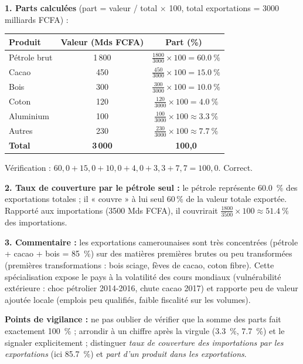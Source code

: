\documentclass[11pt]{article}
\newcommand{\cle}[1]{{\popxbold\color{popdark}#1}}
\begin{document}
\begin{corrige}
\textbf{1. Parts calculées} (part = valeur / total $\times$ 100, total exportations = \num{3000} milliards FCFA) :
\begin{center}
\begin{tabular}{|l|c|c|}\hline
\textbf{Produit} & \textbf{Valeur (Mds FCFA)} & \textbf{Part (\%)\ } \\ \hline
Pétrole brut & 1\,800 & $\frac{1800}{3000}\times100 = \SI{60,0}{\%}$ \\ \hline
Cacao & 450 & $\frac{450}{3000}\times100 = \SI{15,0}{\%}$ \\ \hline
Bois & 300 & $\frac{300}{3000}\times100 = \SI{10,0}{\%}$ \\ \hline
Coton & 120 & $\frac{120}{3000}\times100 = \SI{4,0}{\%}$ \\ \hline
Aluminium & 100 & $\frac{100}{3000}\times100 \approx \SI{3,3}{\%}$ \\ \hline
Autres & 230 & $\frac{230}{3000}\times100 \approx \SI{7,7}{\%}$ \\ \hline
\textbf{Total} & \textbf{3\,000} & \textbf{100,0} \\ \hline
\end{tabular}
\end{center}
Vérification : $60,0 + 15,0 + 10,0 + 4,0 + 3,3 + 7,7 = 100,0$. Correct.

\textbf{2. Taux de couverture par le pétrole seul :} le pétrole représente \SI{60,0}{\%} des exportations totales ; il « couvre » à lui seul 60\,\% de la valeur totale exportée. Rapporté aux importations (\num{3500} Mds FCFA), il couvrirait $\frac{1800}{3500}\times100 \approx \SI{51,4}{\%}$ des importations.

\textbf{3. Commentaire :} les exportations camerounaises sont très \cle{concentrées} (pétrole + cacao + bois = \SI{85}{\%}) sur des matières premières brutes ou peu transformées (premières transformations : bois sciage, fèves de cacao, coton fibre). Cette spécialisation expose le pays à la \cle{volatilité des cours mondiaux} (vulnérabilité extérieure : choc pétrolier 2014-2016, chute cacao 2017) et rapporte peu de valeur ajoutée locale (emplois peu qualifiés, faible fiscalité sur les volumes).

\textbf{Points de vigilance :} ne pas oublier de vérifier que la somme des parts fait exactement \SI{100}{\%} ; arrondir à un chiffre après la virgule (\SI{3,3}{\%}, \SI{7,7}{\%}) et le signaler explicitement ; distinguer \emph{taux de couverture des importations par les exportations} (ici \SI{85,7}{\%}) et \emph{part d'un produit dans les exportations}.
\end{corrige}
\end{document}

